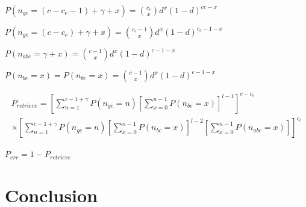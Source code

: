 \documentclass[english,11pt,twocolumn]{article}
\theoremstyle{definition}
\begin{document}
	$P(n_{gc} = (c - c_e - 1) + \gamma + x) = {c_e \choose x} d^x (1-d)^{ce-x}$
	
	$P(n_{ge} = (c - c_e) + \gamma + x) = {c_e - 1 \choose x} d^x (1-d)^{c_e-1-x}$
	
	$P(n_{abe} = \gamma + x) = {c - 1 \choose x} d^x (1-d)^{c-1-x}$
	
	$P(n_{be} = x) = P(n_{bc} = x) = {c - 1 \choose x} d^x (1-d)^{c- 1 -x}$
	
	\begin{align*}
	P_{retrieve} = \left [ \sum_{n = 1}^{c-1+\gamma} P(n_{gc} = n) \left [ \sum_{x=0}^{n-1} P(n_{bc} = x) \right]^{l-1} \right ]^{c - c_e} \\ \times \left [ \sum_{n = 1}^{c-1+\gamma} P(n_{ge} = n) \left [ \sum_{x=0}^{n-1} P(n_{bc} = x) \right]^{l-2} \left [ \sum_{x=0}^{n-1} P(n_{abc} = x) \right] \right ]^{c_e}
	\end{align*}
	
	$P_{err} = 1 - P_{retrieve}$

	\section{Conclusion}	
	
	
	\nocite{*}
         
\end{document}
